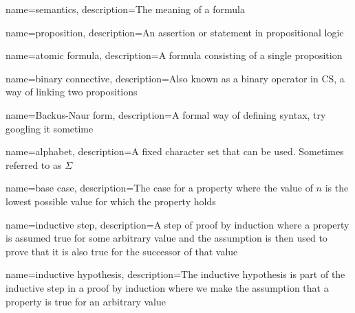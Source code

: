 {
    name={semantics},
    description={The meaning of a formula}
}

{
    name={proposition},
    description={An assertion or statement in propositional logic}
}

{
    name={atomic formula},
    description={A formula consisting of a single proposition}
}

{
    name={binary connective},
    description={Also known as a binary operator in CS, a way of linking two propositions}
}

{
    name={Backus-Naur form},
    description={A formal way of defining syntax, try googling it sometime}
}

{
    name={alphabet},
    description={A fixed character set that can be used. Sometimes referred to as $\Sigma$}
}

{
    name={base case},
    description={The case for a property where the value of $n$ is the lowest possible value for which the property holds}
}

{
    name={inductive step},
    description={A step of proof by induction where a property is assumed true for some arbitrary value and the assumption is then used to prove that it is also true for the successor of that value}
}

{
    name={inductive hypothesis},
    description={The inductive hypothesis is part of the inductive step in a proof by induction where we make the assumption that a property is true for an arbitrary value}
}
